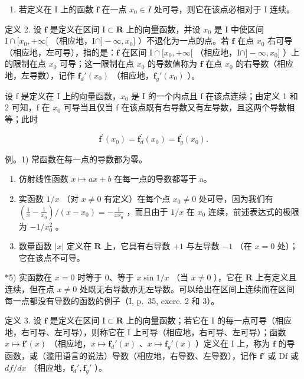 \begin{enumerate}
\def\labelenumi{\arabic{enumi})}
\setcounter{enumi}{1}
\tightlist
\item
  若定义在 I 上的函数 \(\mathbf{f}\) 在一点 \(x_0 \in I\) 处可导，则它在该点必相对于 I 连续。
\end{enumerate}

定义 2. 设 \(\mathbf{f}\) 是定义在区间 \(\mathrm{I} \subset \mathbf{R}\) 上的向量函数，并设 \(x_0\) 是 \(\mathrm{I}\) 中使区间 \(\mathrm{I} \cap [x_0, +\infty[\) （相应地，\(\mathrm{I} \cap ] - \infty, x_0]\) ）不退化为一点的点。若 \(\mathbf{f}\) 在点 \(x_0\) 右可导（相应地，左可导），指的是：\(\mathbf{f}\) 在区间 \(\mathrm{I} \cap [x_0, +\infty[\) （相应地，\(\mathrm{I} \cap ] - \infty, x_0]\) ）上的限制在点 \(x_0\) 可导；这一限制在点 \(x_0\) 的导数值称为 \(\mathbf{f}\) 在点 \(x_0\) 的右导数（相应地，左导数），记作 \(\mathbf{f}_d'(x_0)\) （相应地，\(\mathbf{f}_g'(x_0)\) ）。

设 f 是定义在 I 上的向量函数，\(x_{0}\) 是 I 的一个内点且 f 在该点连续；由定义 1 和 2 可知，f 在 \(x_{0}\) 可导当且仅当 f 在该点既有右导数又有左导数，且这两个导数相等；此时

\[
\mathbf {f} ^ {\prime} (x _ {0}) = \mathbf {f} _ {d} ^ {\prime} (x _ {0}) = \mathbf {f} _ {g} ^ {\prime} (x _ {0}).
\]

例。1) 常函数在每一点的导数都为零。

\begin{enumerate}
\def\labelenumi{\arabic{enumi})}
\setcounter{enumi}{1}
\item
  仿射线性函数 \(x \mapsto ax + b\) 在每一点的导数都等于 a。
\item
  实函数 \(1 / x\) （对 \(x \neq 0\) 有定义）在每个点 \(x_0 \neq 0\) 处可导，因为我们有 \(\left(\frac{1}{x} - \frac{1}{x_0}\right) / (x - x_0) = -\frac{1}{xx_0}\) ，而且由于 \(1 / x\) 在 \(x_0\) 连续，前述表达式的极限为 \(-1 / x_0^2\) 。
\item
  数量函数 \(|x|\) 定义在 \(\mathbf{R}\) 上，它具有右导数 \(+1\) 与左导数 \(-1\) （在 \(x = 0\) 处）；它在该点不可导。
\end{enumerate}

*5) 实函数在 \(x = 0\) 时等于 0、等于 \(x \sin 1/x\) （当 \(x \neq 0\) ），它在 \(\mathbf{R}\) 上有定义且连续，但在点 \(x \neq 0\) 处既无右导数亦无左导数。可以给出在区间上连续而在区间每一点都没有导数的函数的例子（I, p.~35, exerc. 2 和 3）。

定义 3. 设 \(\mathbf{f}\) 是定义在区间 \(\mathrm{I} \subset \mathbf{R}\) 上的向量函数；若它在 \(\mathrm{I}\) 的每一点可导（相应地，右可导、左可导），则称它在 \(\mathrm{I}\) 上可导（相应地，右可导、左可导）；函数 \(x \mapsto \mathbf{f}'(x)\) （相应地，\(x \mapsto \mathbf{f}_d'(x)\) 、\(x \mapsto \mathbf{f}_g'(x)\) ）定义在 \(\mathrm{I}\) 上，称为 \(\mathbf{f}\) 的导函数，或（滥用语言的说法）导数（相应地，右导数、左导数），记作 \(\mathbf{f}'\) 或 \(\mathrm{Df}\) 或 \(df/dx\) （相应地，\(\mathbf{f}_d', \mathbf{f}_g'\) ）。


